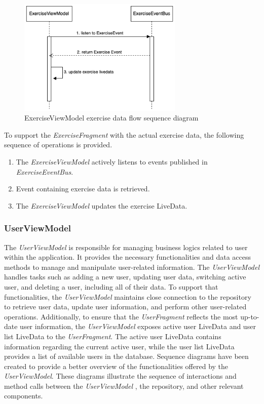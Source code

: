 \begin{figure}[H]
    \centering
    \includegraphics[width=0.7\textwidth]{diagrams/exercise-view-model-seq.drawio.png}
    \caption{ExerciseViewModel exercise data flow sequence diagram}
    \label{fig:exerciseviewmodel_exercisedata}
\end{figure}
To support the \emph{ExerciseFragment} with the actual exercise data, the following sequence of operations is provided.
\begin{enumerate}
    \item The \emph{ExerciseViewModel} actively listens to events published in \emph{ExerciseEventBus}.
    \item Event containing exercise data is retrieved.
    \item The \emph{ExerciseViewModel} updates the exercise LiveData.
\end{enumerate}

\subsubsection{UserViewModel}
\label{chap:userviewmodel_design}
The \emph{UserViewModel} is responsible for managing business logics related to user within the application.
It provides the necessary functionalities and data access methods to manage and manipulate user-related information. 
The \emph{UserViewModel} handles tasks such as adding a new user, updating user data, switching active user, and deleting a user, including all of their data.
To support that functionalities, the \emph{UserViewModel} maintains close connection to the repository to retrieve user data, update user information, and perform other user-related operations. 
Additionally, to ensure that the \emph{UserFragment} reflects the most up-to-date user information, the \emph{UserViewModel} exposes active user LiveData and user list LiveData to the \emph{UserFragment}.
The active user LiveData contains information regarding the current active user, while the user list LiveData provides a list of available users in the database.
Sequence diagrams have been created to provide a better overview of the functionalities offered by the \emph{UserViewModel}. These diagrams illustrate the sequence of interactions and method calls between the \emph{UserViewModel} , the repository, and other relevant components.

